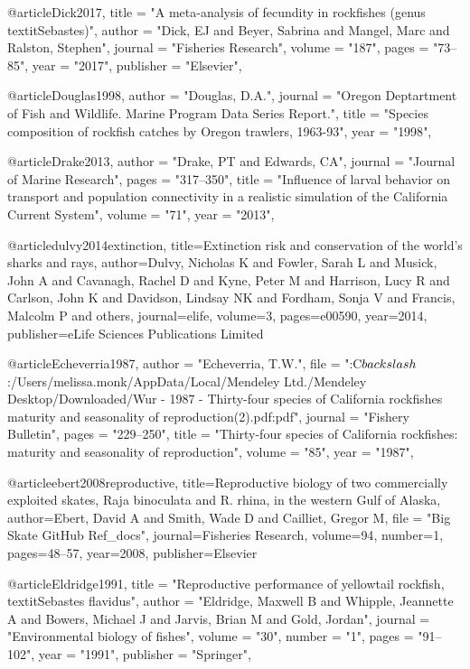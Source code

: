 @article{Dick2017,
    title = "{A meta-analysis of fecundity in rockfishes (genus \\textit{{{Sebastes}}})}",
    author = "{Dick, EJ and Beyer, Sabrina and Mangel, Marc and Ralston, Stephen}",
    journal = "{Fisheries Research}",
    volume = "{187}",
    pages = "{73--85}",
    year = "{2017}",
    publisher = "{Elsevier}",
}

@article{Douglas1998,
    author = "{Douglas, D.A.}",
    journal = "{Oregon Deptartment of Fish and Wildlife. Marine Program Data Series Report.}",
    title = "{{Species composition of rockfish catches by Oregon trawlers, 1963-93}}",
    year = "{1998}",
}

@article{Drake2013,
    author = "{Drake, PT and Edwards, CA}",
    journal = "{Journal of Marine Research}",
    pages = "{317--350}",
    title = "{{Influence of larval behavior on transport and population connectivity in a realistic simulation of the California Current System}}",
    volume = "{71}",
    year = "{2013}",
}

@article{dulvy2014extinction,
  title={Extinction risk and conservation of the world’s sharks and rays},
  author={Dulvy, Nicholas K and Fowler, Sarah L and Musick, John A and Cavanagh, Rachel D and Kyne, Peter M and Harrison, Lucy R and Carlson, John K and Davidson, Lindsay NK and Fordham, Sonja V and Francis, Malcolm P and others},
  journal={elife},
  volume={3},
  pages={e00590},
  year={2014},
  publisher={eLife Sciences Publications Limited}
}

@article{Echeverria1987,
    author = "{Echeverria, T.W.}",
    file = "{:C$\\backslash$:/Users/melissa.monk/AppData/Local/Mendeley Ltd./Mendeley Desktop/Downloaded/Wur - 1987 - Thirty-four species of California rockfishes maturity and seasonality of reproduction(2).pdf:pdf}",
    journal = "{Fishery Bulletin}",
    pages = "{229--250}",
    title = "{{Thirty-four species of California rockfishes: maturity and seasonality of reproduction}}",
    volume = "{85}",
    year = "{1987}",
}

@article{ebert2008reproductive,
  title={Reproductive biology of two commercially exploited skates, Raja binoculata and R. rhina, in the western Gulf of Alaska},
  author={Ebert, David A and Smith, Wade D and Cailliet, Gregor M},
  file = "{Big Skate GitHub Ref_docs}",
  journal={Fisheries Research},
  volume={94},
  number={1},
  pages={48--57},
  year={2008},
  publisher={Elsevier}
}

@article{Eldridge1991,
    title = "{Reproductive performance of yellowtail rockfish, \\textit{{{Sebastes}} flavidus}}",
    author = "{Eldridge, Maxwell B and Whipple, Jeannette A and Bowers, Michael J and Jarvis, Brian M and Gold, Jordan}",
    journal = "{Environmental biology of fishes}",
    volume = "{30}",
    number = "{1}",
    pages = "{91--102}",
    year = "{1991}",
    publisher = "{Springer}",
}

